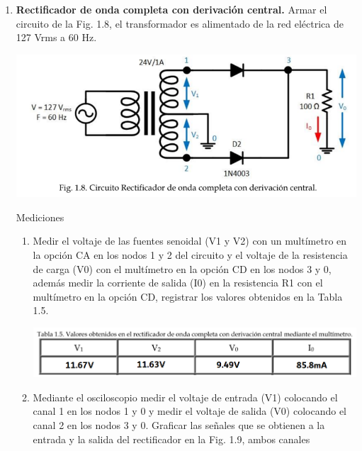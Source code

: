 \documentclass[12pt]{article}
\begin{document}
\begin{enumerate}
\begin{enumerate}
\begin{center}
                \end{center}
            \end{enumerate}
            \item \textbf{Rectificador de onda completa con derivación central.}
            Armar el circuito de la Fig. 1.8, el transformador es alimentado de la red eléctrica de 127 Vrms a
            60 Hz.
            \begin{center}
                \includegraphics*[scale=0.57]{fig1-8.png}
            \end{center}
            \par Mediciones \par
            \begin{enumerate}
                \item Medir el voltaje de las fuentes senoidal (V1 y V2) con un multímetro en la opción CA en los
                nodos 1 y 2 del circuito y el voltaje de la resistencia de carga (V0) con el multímetro en la
                opción CD en los nodos 3 y 0, además medir la corriente de salida (I0) en la resistencia R1
                con el multímetro en la opción CD, registrar los valores obtenidos en la Tabla 1.5.
                \begin{center}
                    \includegraphics*[scale=0.57]{tabla1-5.png}
                \end{center}
                \item Mediante el osciloscopio medir el voltaje de entrada (V1) colocando el canal 1 en los nodos
                1 y 0 y medir el voltaje de salida (V0) colocando el canal 2 en los nodos 3 y 0. Graficar las
                señales que se obtienen a la entrada y la salida del rectificador en la Fig. 1.9, ambos canales

\end{enumerate}
\end{enumerate}
\end{document}

